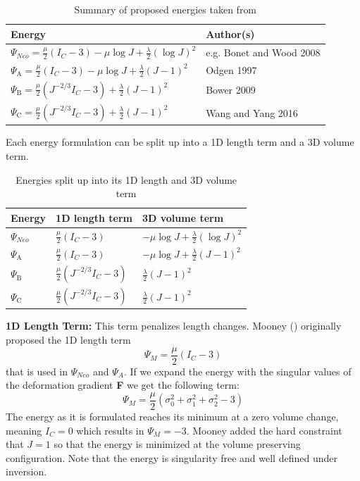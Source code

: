 \begin{table}[!htbp]
\centering
    \begin{tabular}{ | l | l |}
    \hline
    \textbf{Energy} & \textbf{Author(s)} \\ \hline
    $\Psi_{Neo}=\frac{\mu}{2}\left(I_{C}-3\right)-\mu \log J+\frac{\lambda}{2}(\log J)^{2}$ & e.g. Bonet and Wood 2008 \\ \hline
    $\Psi_{\mathrm{A}}=\frac{\mu}{2}\left(I_{C}-3\right)-\mu \log J+\frac{\lambda}{2}(J-1)^{2}$ & Odgen 1997 \\ \hline
    $\Psi_{\mathrm{B}}=\frac{\mu}{2}\left(J^{-2 / 3} I_{C}-3\right)+\frac{\lambda}{2}(J-1)^{2}$ & Bower 2009 \\ \hline
    $\Psi_{\mathrm{C}}=\frac{\mu}{2}\left(J^{-2 / 3} I_{C}-3\right)+\frac{\lambda}{2}(J-1)^{2}$ & Wang and Yang 2016 \\ \hline
    \end{tabular}
    \caption{Summary of proposed energies taken from \cite{Smith:2018:SNF:3191713.3180491}}
\label{table:1}
\end{table}

Each energy formulation can be split up into a 1D length term and a 3D volume term.

\begin{table}[!htbp]
\centering
    \begin{tabular}{ | l | l | l |}
    \hline
    \textbf{Energy} & \textbf{1D length term} & \textbf{3D volume term} \\ \hline
    $\Psi_{Neo}$ & $\frac{\mu}{2}\left(I_{C}-3\right)$ & $-\mu \log J+\frac{\lambda}{2}(\log J)^{2}$ \\ \hline
    $\Psi_{\mathrm{A}}$ & $\frac{\mu}{2}\left(I_{C}-3\right)$ & $-\mu \log J+\frac{\lambda}{2}(J-1)^{2}$ \\ \hline
    $\Psi_{\mathrm{B}}$ & $\frac{\mu}{2}\left(J^{-2 / 3} I_{C}-3\right)$ & $\frac{\lambda}{2}(J-1)^{2}$ \\ \hline
    $\Psi_{\mathrm{C}}$ & $\frac{\mu}{2}\left(J^{-2 / 3} I_{C}-3\right)$ & $\frac{\lambda}{2}(J-1)^{2}$ \\ \hline
    \end{tabular}
    \caption{Energies split up into its 1D length and 3D volume term}
\label{table:1}
\end{table}

\textbf{1D Length Term:} This term penalizes length changes. Mooney (\cite{mooney1940theory}) originally proposed the 1D length term 
\[
\Psi_{M}=\frac{\mu}{2}\left(I_{C}-3\right)
\]
that is used in $\Psi_{Neo}$ and $\Psi_{A}$. If we expand the energy with the singular values of the deformation gradient \textbf{F} we get the following term:
\[
\Psi_{M}=\frac{\mu}{2}\left(\sigma_{0}^2 + \sigma_{1}^2 + \sigma_{2}^2 - 3\right)
\]
The energy as it is formulated reaches its minimum at a zero volume change, meaning $I_{C}=0$ which results in $\Psi_{M}=-3$. Mooney added the hard constraint that $J=1$ so that the energy is minimized at the volume preserving configuration. Note that the energy is singularity free and well defined under inversion.

